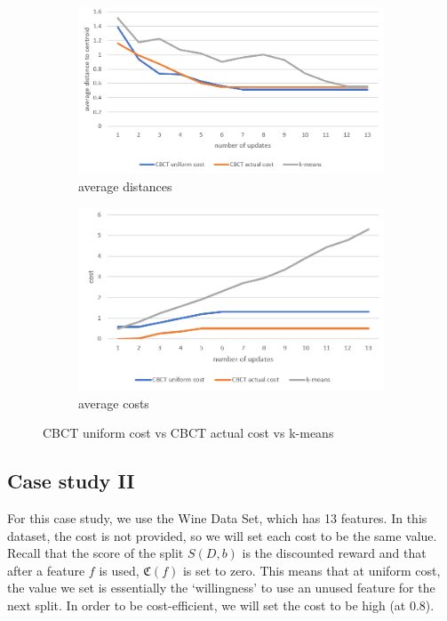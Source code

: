 \documentclass[conference]{IEEEtran}
\begin{document}
\begin{figure}[H]
		\centering
		\begin{subfigure}[b]{0.4\linewidth}
			\includegraphics[width=\linewidth]{img05}
			\caption{average distances}
		\end{subfigure}
		\begin{subfigure}[b]{0.4\linewidth}
			\includegraphics[width=\linewidth]{img06}
			\caption{average costs}
		\end{subfigure}
		\caption{CBCT uniform cost vs CBCT actual cost vs k-means}
		\label{fig2}
\end{figure}

\subsection{Case study II}
For this case study, we use the Wine Data Set, which has 13
features. In this dataset, the cost is not provided, so we will set each cost
to be the same value. Recall that the score of the split $S(D,b)$ is the discounted
reward and that after a feature $f$ is used, $\mathfrak{C}(f)$ is set to zero.
This means that at uniform cost, the value we set is essentially the
`willingness' to use an unused feature for the next split. In order to be
cost-efficient, we will set the cost to be high (at 0.8). 
\end{document}
